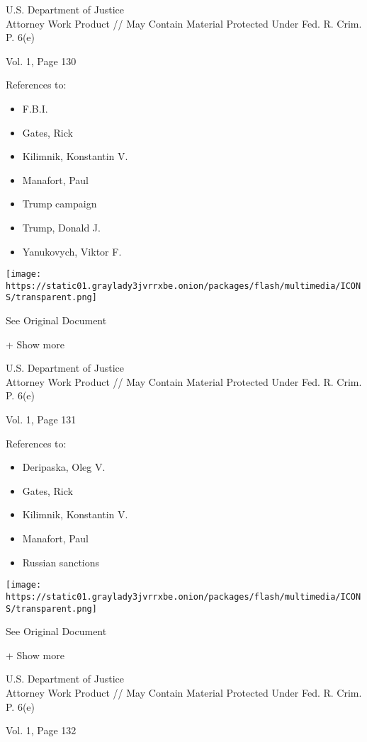U.S. Department of Justice\\
Attorney Work Product // May Contain Material Protected Under Fed. R.
Crim. P. 6(e)

Vol. 1, Page 130

References to:

\begin{itemize}
\tightlist
\item
  F.B.I.
\item
  Gates, Rick
\item
  Kilimnik, Konstantin V.
\item
  Manafort, Paul 
\item
  Trump campaign
\item
  Trump, Donald J.
\item
  Yanukovych, Viktor F.
\end{itemize}

\protect\hyperlink{}{}

\texttt{[image: https://static01.graylady3jvrrxbe.onion/packages/flash/multimedia/ICONS/transparent.png]}

See Original Document

+ Show more

U.S. Department of Justice\\
Attorney Work Product // May Contain Material Protected Under Fed. R.
Crim. P. 6(e)

Vol. 1, Page 131

References to:

\begin{itemize}
\tightlist
\item
  Deripaska, Oleg V.
\item
  Gates, Rick
\item
  Kilimnik, Konstantin V.
\item
  Manafort, Paul 
\item
  Russian sanctions
\end{itemize}

\protect\hyperlink{}{}

\texttt{[image: https://static01.graylady3jvrrxbe.onion/packages/flash/multimedia/ICONS/transparent.png]}

See Original Document

+ Show more

U.S. Department of Justice\\
Attorney Work Product // May Contain Material Protected Under Fed. R.
Crim. P. 6(e)

Vol. 1, Page 132

